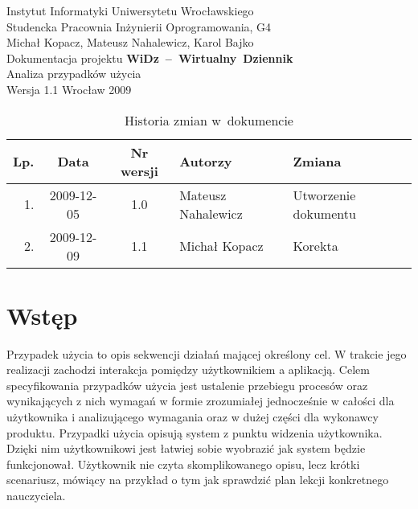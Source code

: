 \documentclass[12pt,leqno,twoside]{mwart}
\begin{document}
\begin{titlepage}
\begin{center}
Instytut Informatyki Uniwersytetu Wrocławskiego \\
Studencka Pracownia Inżynierii Oprogramowania, G4 \\
\vspace{4cm}
\Large Michał Kopacz, Mateusz Nahalewicz, Karol Bajko \\
\vspace{0.5cm}
\huge Dokumentacja projektu \mbox{\textbf{WiDz -- Wirtualny Dziennik}} \\ \Large Analiza przypadków użycia\\
\vspace{1cm}
\normalsize Wersja 1.1
\vfill
\normalsize Wrocław 2009
\end{center}
\end{titlepage}

\newpage

\begin{table}
	\centering
	\caption{Historia zmian w~dokumencie}
		\begin{tabular}{|r|c|c|l|l|}
		\hline
		Lp. 	& Data       & Nr wersji 	& Autorzy           		& Zmiana \\ \hline
		1.   	& 2009-12-05 & 1.0       	& Mateusz Nahalewicz & Utworzenie dokumentu \\ \hline
		2.   	& 2009-12-09 & 1.1       	& Michał Kopacz & Korekta \\ \hline
		\end{tabular}
\end{table}

\newpage

\tableofcontents

\newpage


\section{Wstęp}
\noindent Przypadek użycia to opis sekwencji działań mającej określony cel. W trakcie jego realizacji zachodzi interakcja pomiędzy użytkownikiem a aplikacją. Celem specyfikowania przypadków użycia jest ustalenie przebiegu procesów oraz wynikających z nich wymagań w formie zrozumiałej jednocześnie w całości dla użytkownika i analizującego wymagania oraz w dużej części dla wykonawcy produktu. Przypadki użycia opisują system z punktu widzenia użytkownika. Dzięki nim użytkownikowi jest łatwiej sobie wyobrazić jak system będzie funkcjonował. Użytkownik nie czyta skomplikowanego opisu, lecz krótki scenariusz, mówiący na przykład o tym jak sprawdzić plan lekcji konkretnego nauczyciela.\\
\end{document}

